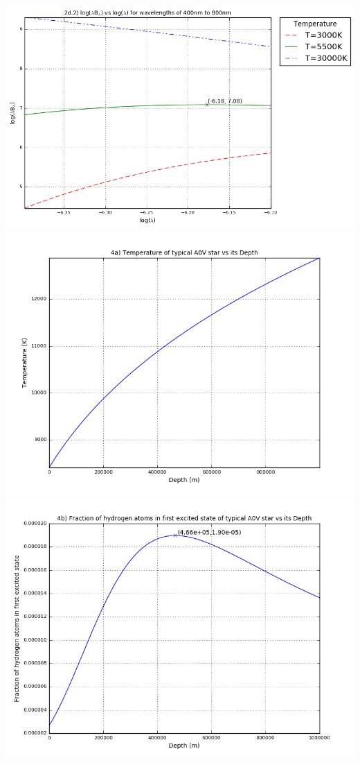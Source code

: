 \documentclass[letter,10pt]{article}
\begin{document}
\includegraphics[scale=0.8]{a2q2d2.png}\\
\includegraphics[scale=0.8]{a2q4a.png}\\
\includegraphics[scale=0.8]{a2q4b.png}\\
\end{document}
